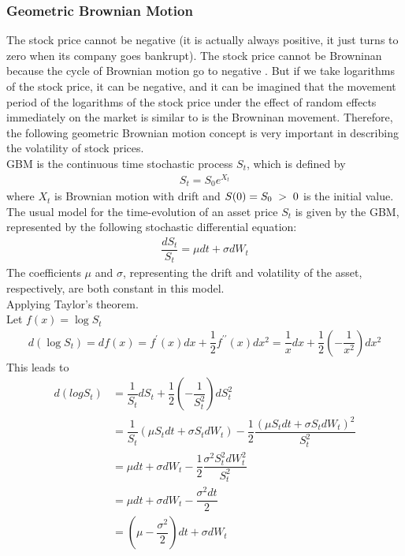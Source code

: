 \subsubsection*{Geometric Brownian Motion}

The stock price cannot be negative (it is actually always positive, it just turns to zero when its company goes bankrupt). The stock price cannot be Browninan because the cycle of Brownian motion go to negative . But if we take logarithms of the stock price, it can be negative, and it can be imagined that the movement period  of the logarithms of the stock price  under the effect of random effects immediately on the market is similar to is the Browninan movement. Therefore, the following geometric Brownian motion concept is very important in describing the volatility of stock prices.\\[0.5cm]
GBM is the continuous time stochastic process $S_t$, which is defined by 
\begin{align*}
S_t=S_0e^{X_t} \label{x}
\end{align*}
where $X_t$ is Brownian motion with drift and $S(0)=S_0 \hspace{0.1cm} > \hspace{0.1cm} 0$ is the initial value. \\
The usual model for the time-evolution of an asset price $S_t$ is given by the GBM, represented by the following stochastic differential equation:
\begin{align*}
\dfrac{dS_t}{S_t}=\mu dt+\sigma dW_t
\end{align*}
The coefficients $\mu$ and $\sigma$, representing the drift and volatility of the asset, respectively, are both constant in this model.  \\[0.5cm]
Applying Taylor's theorem.\\[0.5cm]
Let $f(x)=\log S_t$
\begin{align*}
d(\log S_t)=df(x)=f^{\prime}(x)dx+\dfrac{1}{2}f^{\prime \prime}(x)dx^2=\dfrac{1}{x}dx+\dfrac{1}{2}(-\dfrac{1}{x^2})dx^2
\end{align*}
This leads to
\begin{align*}
d(logS_t)&=\dfrac{1}{S_t}dS_t+\dfrac{1}{2}\left(-\dfrac{1}{S_t^2}\right)dS_t^2\\
&=\dfrac{1}{S_t}(\mu S_tdt+\sigma S_tdW_t)-\dfrac{1}{2}\dfrac{(\mu S_tdt+\sigma S_tdW_t)^2}{S_t^2}\\
&=\mu dt+\sigma dW_t-\dfrac{1}{2}\dfrac{\sigma^2S_t^2dW_t^2}{S_t^2}\\
&=\mu dt+\sigma dW_t-\dfrac{\sigma^2dt}{2}\\
&=(\mu-\dfrac{\sigma^2}{2})dt+\sigma dW_t
\end{align*}
